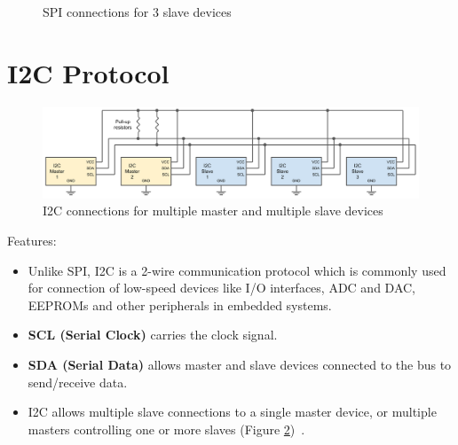 \begin{itemize}
\begin{figure}[h!]
    \caption{SPI connections for 3 slave devices}
    \label{SPI_multi_slave}
    \end{figure}
\end{itemize}

\newpage
\section{I2C Protocol}

\begin{figure}[h!]
\centering
\includegraphics[width=\columnwidth]{./Figures/I2C_multi_master.png}
\caption{I2C connections for multiple master and multiple slave devices}
\label{I2C_multi_master}
\end{figure}

Features:
\begin{itemize}
    \item Unlike SPI, I2C is a 2-wire communication protocol which is commonly used for connection of low-speed devices like I/O interfaces, ADC and DAC, EEPROMs and other peripherals in embedded systems.
    \item \textbf{SCL (Serial Clock)} carries the clock signal.
    \item \textbf{SDA (Serial Data)} allows master and slave devices connected to the bus to send/receive data. 
    \item I2C allows multiple slave connections to a single master device, or  multiple masters controlling one or more slaves (Figure \ref{I2C_multi_master})~\cite{Serial_protocols}.
\end{itemize}
